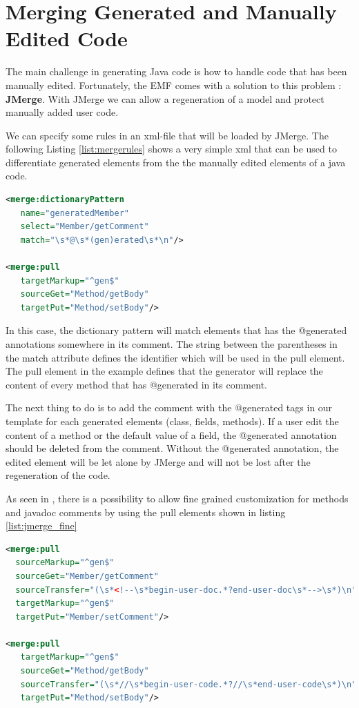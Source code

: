 \section{Merging Generated and Manually Edited Code}
The main challenge in generating Java code is how to handle code that has been manually edited. Fortunately, the EMF comes with a solution to this problem : \textbf{JMerge}\cite{JMERGEFAQ}. With JMerge we can allow a regeneration of a model and protect manually added user code. 

We can specify some rules in an xml-file that will be loaded by JMerge.  The following Listing \ref{list:mergerules} shows a very simple xml that can be used to differentiate generated elements from the the manually edited elements of a java code. 

\begin{lstlisting}[language=xml, caption = Example JMerge Rule, label=list:mergerules]
<merge:dictionaryPattern
   name="generatedMember" 
   select="Member/getComment" 
   match="\s*@\s*(gen)erated\s*\n"/>

<merge:pull 
   targetMarkup="^gen$"
   sourceGet="Method/getBody"
   targetPut="Method/setBody"/>
\end{lstlisting}

In this case, the dictionary pattern will match elements that has the @generated annotations somewhere in its comment. The string between the parentheses in the match attribute defines the identifier which will be used in the pull element. The pull element in the example defines that the generator will replace the content of every method that has @generated in its comment.

The next thing to do is to add the comment with the @generated tags in our template for each generated elements (class, fields, methods). 
If a user edit the content of a method or the default value of a field, the @generated annotation should be deleted from the comment. Without the @generated annotation, the edited element will be let alone by JMerge and will not be lost after the regeneration of the code.  

As seen in \cite{APJMERGE}, there is a possibility to allow fine grained customization for methods and javadoc comments by using the pull elements shown in listing \ref{list:jmerge_fine}
\begin{lstlisting}[language=xml, caption=JMerge example: fine grained customization for javadoc comments and methods, label = ref{list:jmerge_fine}]
<merge:pull 
  sourceMarkup="^gen$"
  sourceGet="Member/getComment"
  sourceTransfer="(\s*<!--\s*begin-user-doc.*?end-user-doc\s*-->\s*)\n"
  targetMarkup="^gen$"
  targetPut="Member/setComment"/>
  
<merge:pull 
   targetMarkup="^gen$"
   sourceGet="Method/getBody"
   sourceTransfer="(\s*//\s*begin-user-code.*?//\s*end-user-code\s*)\n"
   targetPut="Method/setBody"/>

\end{lstlisting}

